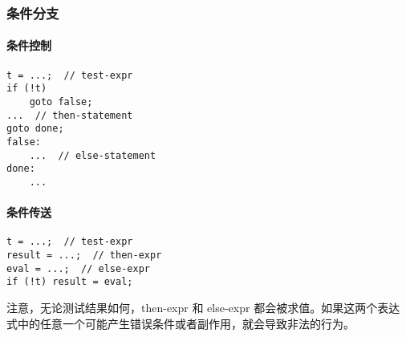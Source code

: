 \subsubsection{条件分支}
\paragraph{条件控制}
\begin{lstlisting}[style=CStyle]
t = ...;  // test-expr
if (!t)
    goto false;
...  // then-statement
goto done;
false:
    ...  // else-statement
done:
    ...
\end{lstlisting}
\paragraph{条件传送}
\begin{lstlisting}[style=CStyle]
t = ...;  // test-expr
result = ...;  // then-expr
eval = ...;  // else-expr
if (!t) result = eval;
\end{lstlisting}

注意，无论测试结果如何，then-expr 和 else-expr 都会被求值。如果这两个表达式中的任意一个可能产生错误条件或者副作用，就会导致非法的行为。

